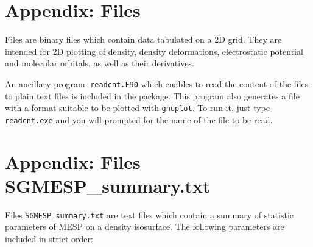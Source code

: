 \documentclass[10pt]{article}
\begin{document}
\section{Appendix: Files \cnt\label{A4}}

Files \cnt{} are binary files which contain data
tabulated on a 2D grid. They are intended for 2D plotting of density, density
deformations, electrostatic potential and molecular orbitals, as well as their
derivatives. 

An ancillary program: \texttt{readcnt.F90} which enables to read
the content of the \cnt{ } files to plain text files is included in the
package. This program also generates a file with a format suitable to be
plotted with \texttt{gnuplot}. To run it, just type \texttt{readcnt.exe} and you
will prompted for the name of the \cnt{ } file to be read.

\section{Appendix: Files SGMESP\_summary.txt\label{A5}}

Files \texttt{SGMESP\_summary.txt} are text files which contain a summary of statistic 
parameters of MESP on a density isosurface. The following parameters are included
in strict order:
\end{document}
